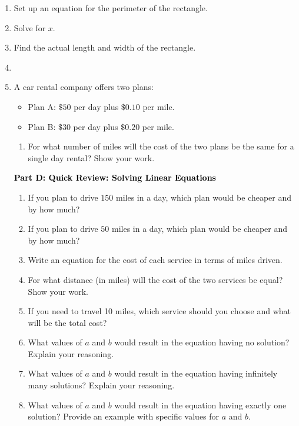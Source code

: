 \documentclass[12pt, letterpaper, fleqn]{article}
\begin{document}
\begin{enumerate}[itemsep=4.2cm, leftmargin=0.6cm, resume]
\begin{enumerate}[itemsep=4.2cm, leftmargin=0.6cm, resume]
\item Set up an equation for the perimeter of the rectangle.
\item Solve for $x$.
\item Find the actual length and width of the rectangle.
\item %
\item A car rental company offers two plans:
    \begin{itemize}
\item Plan A: $\$50$ per day plus $\$0.10$ per mile.
\item Plan B: $\$30$ per day plus $\$0.20$ per mile.
    \end{itemize}
    \begin{enumerate}[label=\alph*.]
\item For what number of miles will the cost of the two plans be the same for a single day rental? Show your work.
\end{enumerate}

\newpage

\begin{tcolorbox}[colback=customteal!20]
\large\textcolor{black}{\textbf{Part D: Quick Review: Solving Linear Equations}}
\end{tcolorbox}

\vspace{3mm}

\begin{enumerate}[itemsep=4.2cm, leftmargin=0.6cm, resume]
\item If you plan to drive $150$ miles in a day, which plan would be cheaper and by how much?
\item If you plan to drive $50$ miles in a day, which plan would be cheaper and by how much?

\item Write an equation for the cost of each service in terms of miles driven.
\item For what distance (in miles) will the cost of the two services be equal? Show your work.
\item If you need to travel 10 miles, which service should you choose and what will be the total cost?

\item What values of $a$ and $b$ would result in the equation having no solution? Explain your reasoning.
\item What values of $a$ and $b$ would result in the equation having infinitely many solutions? Explain your reasoning.
\item What values of $a$ and $b$ would result in the equation having exactly one solution? Provide an example with specific values for $a$ and $b$.
\end{enumerate}

\end{enumerate}
\end{enumerate}
\end{document}
